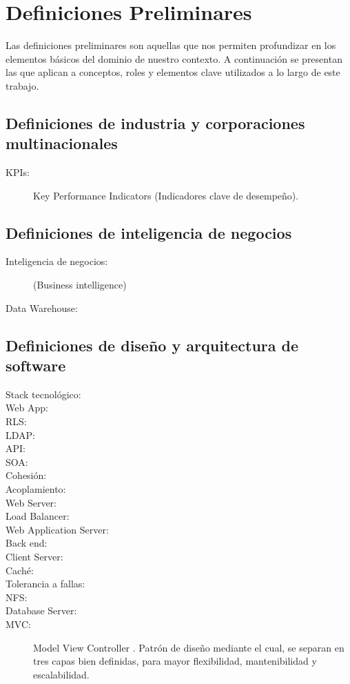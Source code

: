\chapter{Definiciones Preliminares}

Las definiciones preliminares son aquellas que nos permiten profundizar en los elementos básicos del dominio de nuestro contexto. A continuación se presentan las que aplican a conceptos, roles y elementos clave utilizados a lo largo de este trabajo.

\section{Definiciones de industria y corporaciones multinacionales}
\begin{description}
    \item [KPIs:] Key Performance Indicators (Indicadores clave de desempeño).
\end{description}

\section{Definiciones de inteligencia de negocios}

\begin{description}
    \item [Inteligencia de negocios:] (Business intelligence)
    \item [Data Warehouse:]
\end{description}

\section{Definiciones de diseño y arquitectura de software}
\begin{description}
    \item[Stack tecnológico:] 
    \item [Web App:]
    \item [RLS:]
    \item [LDAP:]
    \item [API:]
    \item [SOA:]
    \item [Cohesión:]
    \item [Acoplamiento:]
    \item [Web Server:]
    \item [Load Balancer:]
    \item [Web Application Server:]
    \item [Back end:]
    \item [Client Server:]
    \item [Caché:]
    \item [Tolerancia a fallas:]
    \item [NFS:]
    \item [Database Server:]
    \item [MVC:] Model View Controller \cite{pope1988}. Patrón de diseño mediante el cual, se separan en tres capas bien definidas, para mayor flexibilidad, mantenibilidad y escalabilidad.
    
\end{description}

